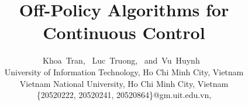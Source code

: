 %
%






\documentclass[journal]{IEEEtran}

\usepackage{xcolor,soul,framed} %

\usepackage[pdftex]{graphicx}
\usepackage[]{algorithm2e}
\graphicspath{{../pdf/}{../jpeg/}}
\usepackage[cmex10]{amsmath}
\usepackage{array}
\usepackage{mdwmath}
\usepackage{mdwtab}
\usepackage{eqparbox}
\usepackage{url}

\usepackage{amssymb, amsfonts}
\usepackage{algorithm}
\usepackage{algpseudocode}
\usepackage{algcompatible}





    \title{Off-Policy Algorithms for Continuous Control}
  \author{Khoa~Tran,~\IEEEmembership{,}
      Luc~Truong,~\IEEEmembership{}
      and~Vu~Huynh\,~\IEEEmembership{}\\
      University of Information Technology, Ho Chi Minh City, Vietnam\\
Vietnam National University, Ho Chi Minh City, Vietnam\\
\{20520222, 20520241, 20520864\}@gm.uit.edu.vn,%
      }



\maketitle

